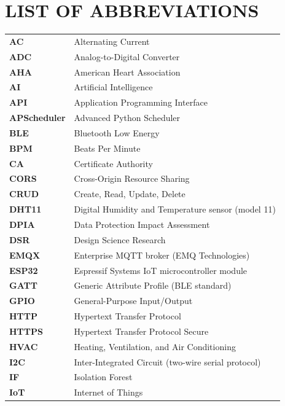 \chapter*{LIST OF ABBREVIATIONS}

{\small
\renewcommand{\arraystretch}{0.7}
\begin{longtable}{@{}p{3.2cm} p{11cm}@{}}
\textbf{AC}     & Alternating Current \\
\textbf{ADC}    & Analog-to-Digital Converter \\
\textbf{AHA}    & American Heart Association \\
\textbf{AI}     & Artificial Intelligence \\
\textbf{API}    & Application Programming Interface \\
\textbf{APScheduler} & Advanced Python Scheduler \\
\textbf{BLE}    & Bluetooth Low Energy \\
\textbf{BPM}    & Beats Per Minute \\
\textbf{CA}     & Certificate Authority \\
\textbf{CORS}   & Cross-Origin Resource Sharing \\
\textbf{CRUD}   & Create, Read, Update, Delete \\
\textbf{DHT11}  & Digital Humidity and Temperature sensor (model 11) \\
\textbf{DPIA}   & Data Protection Impact Assessment \\
\textbf{DSR}    & Design Science Research \\
\textbf{EMQX}   & Enterprise MQTT broker (EMQ Technologies) \\
\textbf{ESP32}  & Espressif Systems IoT microcontroller module \\
\textbf{GATT}   & Generic Attribute Profile (BLE standard) \\
\textbf{GPIO}   & General-Purpose Input/Output \\
\textbf{HTTP}   & Hypertext Transfer Protocol \\
\textbf{HTTPS}  & Hypertext Transfer Protocol Secure \\
\textbf{HVAC}   & Heating, Ventilation, and Air Conditioning \\
\textbf{I2C}    & Inter-Integrated Circuit (two-wire serial protocol) \\
\textbf{IF}     & Isolation Forest \\
\textbf{IoT}    & Internet of Things \\

\end{longtable}}
